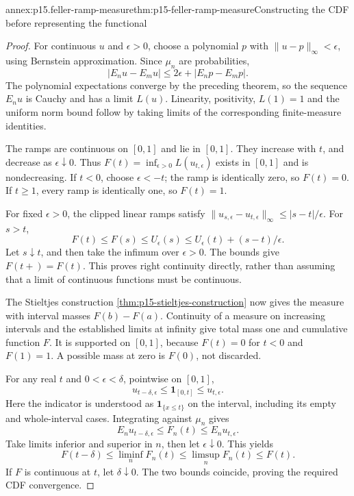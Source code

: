 \begin{annexitem}{annex:p15.feller-ramp-measure}{thm:p15-feller-ramp-measure}{Constructing the CDF before representing the functional}
\begin{proof}
For continuous \(u\) and \(\epsilon>0\), choose a polynomial \(p\)
with \(\|u-p\|_\infty<\epsilon\), using Bernstein approximation.
Since \(\mu_n\) are probabilities,
\[
                     |E_nu-E_mu|
                        \leq2\epsilon+|E_np-E_mp|.
\]
The polynomial expectations converge by the preceding theorem,
so the sequence \(E_nu\) is Cauchy and has a limit \(L(u)\).
Linearity, positivity, \(L(1)=1\) and the uniform norm bound
follow by taking limits of the corresponding finite-measure identities.

The ramps are continuous on \([0,1]\) and lie in \([0,1]\).
They increase with \(t\), and decrease as \(\epsilon\downarrow0\).
Thus \(F(t)=\inf_{\epsilon>0}L(u_{t,\epsilon})\) exists in \([0,1]\)
and is nondecreasing. If \(t<0\), choose \(\epsilon<-t\);
the ramp is identically zero, so \(F(t)=0\).
If \(t\geq1\), every ramp is identically one, so \(F(t)=1\).

For fixed \(\epsilon>0\), the clipped linear ramps satisfy
\(\|u_{s,\epsilon}-u_{t,\epsilon}\|_\infty\leq|s-t|/\epsilon\).
For \(s>t\),
\[
           F(t)\leq F(s)\leq U_\epsilon(s)
                      \leq U_\epsilon(t)+(s-t)/\epsilon.
\]
Let \(s\downarrow t\), and then take the infimum over \(\epsilon>0\).
The bounds give \(F(t+)=F(t)\).
This proves right continuity directly, rather than assuming that a
limit of continuous functions must be continuous.

The Stieltjes construction \cref{thm:p15-stieltjes-construction}
now gives the measure with interval masses \(F(b)-F(a)\).
Continuity of a measure on increasing intervals and the established
limits at infinity give total mass one and cumulative function \(F\).
It is supported on \([0,1]\), because \(F(t)=0\) for \(t<0\)
and \(F(1)=1\). A possible mass at zero is \(F(0)\), not discarded.

For any real \(t\) and \(0<\epsilon<\delta\), pointwise on \([0,1]\),
\[
                  u_{t-\delta,\epsilon}
                          \leq\mathbf1_{[0,t]}\leq u_{t,\epsilon}.
\]
Here the indicator is understood as \(\mathbf1_{\{x\leq t\}}\)
on the interval, including its empty and whole-interval cases.
Integrating against \(\mu_n\) gives
\[
                  E_nu_{t-\delta,\epsilon}
                         \leq F_n(t)\leq E_nu_{t,\epsilon}.
\]
Take limits inferior and superior in \(n\), then let
\(\epsilon\downarrow0\). This yields
\[
            F(t-\delta)\leq\liminf_nF_n(t)
                     \leq\limsup_nF_n(t)\leq F(t).
\]
If \(F\) is continuous at \(t\), let \(\delta\downarrow0\).
The two bounds coincide, proving the required CDF convergence.
\end{proof}
\end{annexitem}

